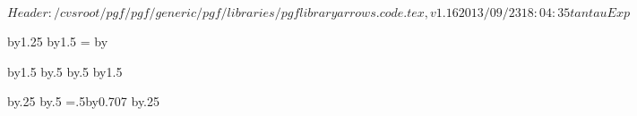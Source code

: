 %
%
%

\ProvidesFileRCS[v\pgfversion] $Header: /cvsroot/pgf/pgf/generic/pgf/libraries/pgflibraryarrows.code.tex,v 1.16 2013/09/23 18:04:35 tantau Exp $



{
  \pgfutil@tempdima=1pt%
  \advance\pgfutil@tempdima by1.25\pgflinewidth%
  \pgfarrowsleftextend{+-\pgfutil@tempdima}
  \pgfarrowsrightextend{+.5\pgflinewidth}
}
{
  \pgfutil@tempdima=2pt%
  \advance\pgfutil@tempdima by1.5\pgflinewidth%
  \pgfutil@tempdimb=\pgfutil@tempdima%
  \advance\pgfutil@tempdimb by\pgflinewidth%
  \pgfsetdash{}{+0pt}
  \pgfsetmiterjoin
  \pgfsetbuttcap
  \pgfpathlineto{\pgfqpoint{0pt}{\pgfutil@tempdima}}
  \pgfusepathqstroke
}

\pgfarrowsdeclarereversed{]}{[}{[}{]}



\pgfarrowsdeclare{(}{)}
{
  \pgfutil@tempdima=2pt%
  \advance\pgfutil@tempdima by1.5\pgflinewidth%
  \pgfutil@tempdima\advance\pgfutil@tempdimb by.5\pgflinewidth%
  \pgfarrowsrightextend{+\pgfutil@tempdimb}
  \pgfutil@tempdima\advance\pgfutil@tempdimb by.5\pgflinewidth%
  \pgfarrowsleftextend{+-\pgfutil@tempdimb}
}
{
  \pgfutil@tempdima=2pt%
  \advance\pgfutil@tempdima by1.5\pgflinewidth%
  \pgfsetdash{}{+0pt}
  \pgfsetroundcap
  \pgfpathcurveto
  {}
  {}
  {}
  \pgfusepathqstroke
}

\pgfarrowsdeclarereversed{)}{(}{(}{)}





{
  \pgfutil@tempdima=0.3pt%
  \advance\pgfutil@tempdima by.25\pgflinewidth%
  \pgfutil@tempdima\advance\pgfutil@tempdimb by.5\pgflinewidth%
  \pgfarrowsleftextend{+-\pgfutil@tempdimb}
  \pgfutil@tempdimb=.5\pgfutil@tempdima\advance\pgfutil@tempdimb by0.707\pgflinewidth%
  \pgfarrowsrightextend{+\pgfutil@tempdimb}
}
{
  \pgfutil@tempdima=0.3pt%
  \advance\pgfutil@tempdima by.25\pgflinewidth%
  \pgfsetdash{}{+0pt}
  \pgfsetroundcap
  \pgfsetmiterjoin
  \pgfusepathqstroke
}

